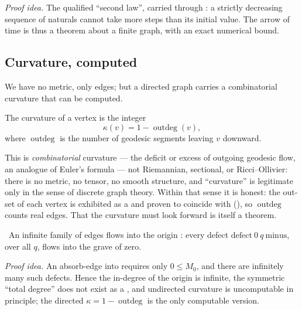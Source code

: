 \emph{Proof idea.} The qualified ``second law'', carried through
: a strictly decreasing sequence of naturals cannot take more
steps than its initial value. The arrow of time is thus a theorem about a finite graph, with an
exact numerical bound.

\subsection{Curvature, computed}

We have no metric, only edges; but a directed graph carries a combinatorial curvature that can be
computed.

\begin{definition}\label{def:curvature}
The curvature of a vertex is the integer
\begin{equation}\label{eq:curvature}
\kappa(v) = 1 - \operatorname{outdeg}(v),
\end{equation}
where $\operatorname{outdeg}$ is the number of geodesic segments leaving $v$ downward.
\end{definition}

This is \emph{combinatorial} curvature --- the deficit or excess of outgoing geodesic flow, an
analogue of Euler's formula --- not Riemannian, sectional, or Ricci--Ollivier: there is no metric,
no tensor, no smooth structure, and ``curvature'' is legitimate only in the sense of discrete graph
theory. Within that sense it is honest: the out-set of each vertex is exhibited as a 
and proven to coincide with  (), so $\operatorname{outdeg}$
counts real edges. That the curvature must look forward is itself a theorem.

\begin{theorem}\label{thm:inDegree_infinite_at_origin}
\green{}\ An infinite family of edges flows into the origin : every defect
$\mathrm{defect}\ 0\ q\ \mathrm{minus}$, over all $q$, flows into the grave of zero.
\end{theorem}

\emph{Proof idea.} An absorb-edge into  requires only $0 \le M_0$, and there are
infinitely many such defects. Hence the in-degree of the origin is infinite, the symmetric ``total
degree'' does not exist as a , and undirected curvature is uncomputable in principle;
the directed $\kappa = 1 - \operatorname{outdeg}$ is the only computable version.

